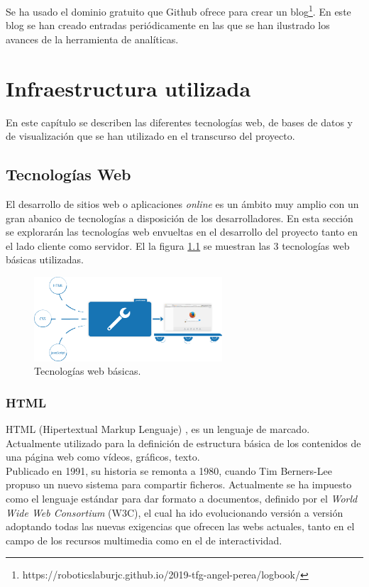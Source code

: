 \documentclass[a4paper, 12pt]{book}
\begin{document}
		Se ha usado el dominio gratuito que Github ofrece para crear un blog\footnote{https://roboticslaburjc.github.io/2019-tfg-angel-perea/logbook/}. En este blog se han creado entradas periódicamente en las que se han ilustrado los avances de la herramienta de analíticas.  
		

		
	\cleardoublepage 
	\chapter{Infraestructura utilizada} 
	\label{chap:infraestructura_utilizada} 
		En este capítulo se describen las diferentes tecnologías web, de bases de datos y de visualización que se han utilizado en el transcurso del proyecto.
		
	\section{Tecnologías Web} 
	\label{sec:tecnologias_web} 
		El desarrollo de sitios web o aplicaciones \textit{online} es un ámbito muy amplio con un gran abanico de tecnologías a disposición de los desarrolladores. En esta sección se explorarán las tecnologías web envueltas en el desarrollo del proyecto tanto en el lado cliente como servidor. El la figura \ref{fig:HTML_CSS_JS} se muestran las 3 tecnologías web básicas utilizadas.
		
		\begin{figure}[H]
			\centering
			\includegraphics[width=7cm, keepaspectratio]{img/html_css_js.png}
			\caption{Tecnologías web básicas.}
			\label{fig:HTML_CSS_JS}
		\end{figure}
	
	\subsection{HTML}
	\label{subsec:html}
		HTML (Hipertextual Markup Lenguaje) \cite{HTML}, es un lenguaje de marcado. Actualmente utilizado para la definición de  estructura básica de los contenidos de una página web como vídeos, gráficos, texto. \\
		
		Publicado en 1991, su historia se remonta a 1980, cuando Tim Berners-Lee propuso un nuevo sistema para compartir ficheros. Actualmente se ha impuesto como el lenguaje estándar para dar formato a documentos, definido por el \textit{World Wide Web Consortium} (W3C), el cual ha ido evolucionando versión a versión adoptando todas las nuevas exigencias que ofrecen las webs actuales, tanto en el campo de los recursos multimedia como en el de interactividad.\\
		
\end{document}
